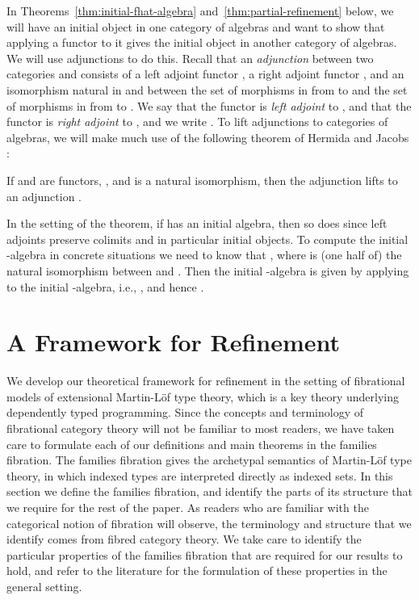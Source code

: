 \documentclass{LMCS}
\begin{document}
In Theorems~\ref{thm:initial-fhat-algebra}
and~\ref{thm:partial-refinement} below, we will have an initial object
in one category of algebras and want to show that applying a functor
to it gives the initial object in another category of algebras. We
will use adjunctions to do this. Recall that an {\em adjunction}
 between two categories 
and  consists of a left adjoint functor , a right adjoint
functor , and an isomorphism natural in  and  between the set
 of morphisms in  from  to  and the set
 of morphisms in  from  to . We say
that the functor  is {\em left adjoint} to , and that the
functor  is {\em right adjoint} to , and we write . To lift adjunctions to categories of algebras, we will make much
use of the following theorem of Hermida and Jacobs
\cite{hermida98structural}:
\begin{thm}\label{thm:alg-adjunctions}
  If  and  are
  functors, , and  is a natural
  isomorphism, then the adjunction
   lifts to an adjunction
  .
\end{thm}

\noindent
In the setting of the theorem, if  has an initial algebra, then so
does  since left adjoints preserve colimits and in particular
initial objects. To compute the initial -algebra in concrete
situations we need to know that ,
where  is (one half of) the natural isomorphism between 
and . Then the initial -algebra is given by applying
 to the initial -algebra, i.e., , and hence .

\section{A Framework for Refinement}\label{sec:families}

We develop our theoretical framework for refinement in the setting of
fibrational models of extensional Martin-L\"of type theory, which is a
key theory underlying dependently typed programming.  Since the
concepts and terminology of fibrational category theory will not be
familiar to most readers, we have taken care to formulate each of our
definitions and main theorems in the families fibration. The families
fibration gives the archetypal semantics of Martin-L\"of type theory,
in which indexed types are interpreted directly as indexed sets. In
this section we define the families fibration, and identify the parts
of its structure that we require for the rest of the paper. As readers
who are familiar with the categorical notion of fibration will
observe, the terminology and structure that we identify comes from
fibred category theory. We take care to identify the particular
properties of the families fibration that are required for our results
to hold, and refer to the literature for the formulation of these
properties in the general setting.
\end{document}
